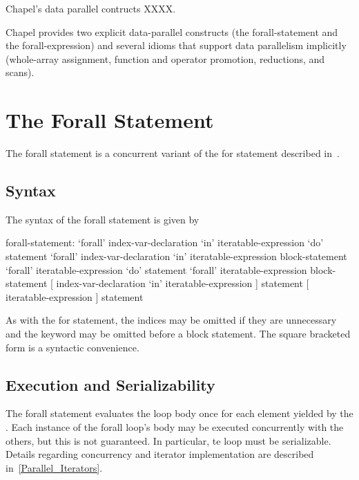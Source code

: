 \label{Data_Parallelism}

Chapel's data parallel contructs XXXX.

Chapel provides two explicit data-parallel constructs (the
forall-statement and the forall-expression) and several idioms that
support data parallelism implicitly (whole-array assignment, function
and operator promotion, reductions, and scans).

\section{The Forall Statement}
\label{Forall}

The forall statement is a concurrent variant of the for statement
described in~.

\subsection{Syntax}
\label{forall_syntax}

The syntax of the forall statement is given by
\begin{syntax}
forall-statement:
  `forall' index-var-declaration `in' iteratable-expression `do' statement
  `forall' index-var-declaration `in' iteratable-expression block-statement
  `forall' iteratable-expression `do' statement
  `forall' iteratable-expression block-statement
  [ index-var-declaration `in' iteratable-expression ] statement
  [ iteratable-expression ] statement
\end{syntax}
As with the for statement, the indices may be omitted if they are
unnecessary and the  keyword may be omitted before a block
statement.  The square bracketed form is a syntactic convenience.

\subsection{Execution and Serializability}
\label{forall_semantics}

The forall statement evaluates the loop body once for each element
yielded by the .  Each instance of the
forall loop's body may be executed concurrently with the others, but
this is not guaranteed.  In particular, te loop must be serializable.
Details regarding concurrency and iterator implementation are
described in~\ref{Parallel_Iterators}.


